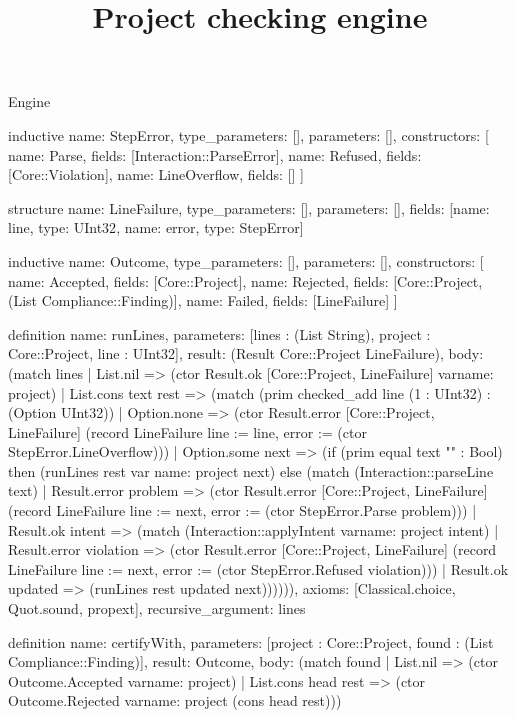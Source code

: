 \begin{lexlean}{Engine}
\title{Project checking engine}
\begin{semanticmodule}
inductive{
  name: StepError,
  type_parameters: [],
  parameters: [],
  constructors: [
    {name: Parse, fields: [Interaction::ParseError]},
    {name: Refused, fields: [Core::Violation]},
    {name: LineOverflow, fields: []}
  ]
}

structure{
  name: LineFailure,
  type_parameters: [],
  parameters: [],
  fields: [{name: line, type: UInt32}, {name: error, type: StepError}]
}

inductive{
  name: Outcome,
  type_parameters: [],
  parameters: [],
  constructors: [
    {name: Accepted, fields: [Core::Project]},
    {name: Rejected, fields: [Core::Project, (List Compliance::Finding)]},
    {name: Failed, fields: [LineFailure]}
  ]
}

definition{
  name: runLines,
  parameters: [lines : (List String), project : Core::Project, line : UInt32],
  result: (Result Core::Project LineFailure),
  body: (match lines
    | List.nil => (ctor Result.ok [Core::Project, LineFailure] var{name: project})
    | List.cons text rest => (match (prim checked_add line (1 : UInt32) : (Option UInt32))
      | Option.none => (ctor Result.error [Core::Project, LineFailure] (record LineFailure {line := line, error := (ctor StepError.LineOverflow)}))
      | Option.some next => (if (prim equal text "" : Bool) then (runLines rest var{
        name: project
      } next) else (match (Interaction::parseLine text)
        | Result.error problem => (ctor Result.error [Core::Project, LineFailure] (record LineFailure {line := next, error := (ctor StepError.Parse problem)}))
        | Result.ok intent => (match (Interaction::applyIntent var{name: project} intent)
          | Result.error violation => (ctor Result.error [Core::Project, LineFailure] (record LineFailure {line := next, error := (ctor StepError.Refused violation)}))
          | Result.ok updated => (runLines rest updated next)))))),
  axioms: [Classical.choice, Quot.sound, propext],
  recursive_argument: lines
}

definition{
  name: certifyWith,
  parameters: [project : Core::Project, found : (List Compliance::Finding)],
  result: Outcome,
  body: (match found
    | List.nil => (ctor Outcome.Accepted var{name: project})
    | List.cons head rest => (ctor Outcome.Rejected var{name: project} (cons head rest)))
}


\end{semanticmodule}
\end{lexlean}
